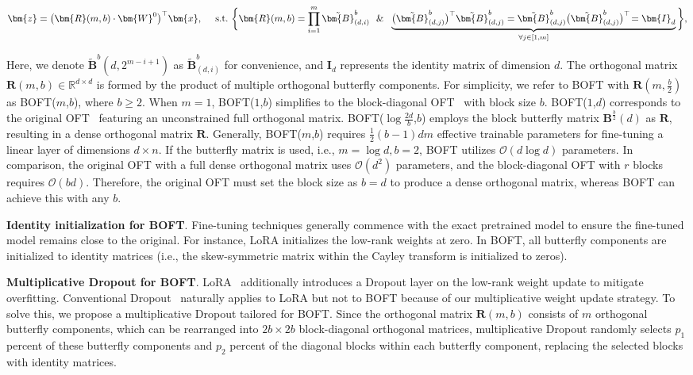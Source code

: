 \begin{equation}
    \begin{aligned}\nonumber
    \bm{z}=\big(\bm{R}(m,b)\cdot\bm{W}^0\big)^\top\bm{x},~~~~\text{s.t.}~\bigg{\{}\bm{R}(m,b)=\prod_{i=1}^m \tilde{\bm{B}}^b_{(d,i)}~~\&~~\underbrace{\big(\tilde{\bm{B}}^b_{(d,j)}\big)^\top\tilde{\bm{B}}^b_{(d,j)}=\tilde{\bm{B}}^b_{(d,j)}\big(\tilde{\bm{B}}^b_{(d,j)}\big)^\top\!=\bm{I}_d}_{\forall j\in [1, m]}\bigg{\}},
    \end{aligned}
\end{equation}

Here, we denote $\tilde{\bm{B}}^b(d,2^{m - i+1})$ as $\tilde{\bm{B}}^b_{(d,i)}$ for convenience, and $\bm{I}_d$ represents the identity matrix of dimension $d$. The orthogonal matrix $\bm{R}(m,b)\in\mathbb{R}^{d\times d}$ is formed by the product of multiple orthogonal butterfly components. For simplicity, we refer to BOFT with $\bm{R}(m,\frac{b}{2})$ as BOFT($m$,$b$), where $b\geq 2$. When $m=1$, BOFT($1$,$b$) simplifies to the block-diagonal OFT~\cite{qiu2023controlling} with block size $b$. BOFT($1$,$d$) corresponds to the original OFT~\cite{qiu2023controlling} featuring an unconstrained full orthogonal matrix. BOFT($\log \frac{2d}{b}$,$b$) employs the block butterfly matrix $\bm{B}^{\frac{b}{2}}(d)$ as $\bm{R}$, resulting in a dense orthogonal matrix $\bm{R}$. Generally, BOFT($m$,$b$) requires $\frac{1}{2}(b-1)dm$ effective trainable parameters for fine-tuning a linear layer of dimensions $d\times n$. If the butterfly matrix is used, i.e., $m=\log d,b=2$, BOFT utilizes $\mathcal{O}(d\log d)$ parameters. In comparison, the original OFT with a full dense orthogonal matrix uses $\mathcal{O}(d^2)$ parameters, and the block-diagonal OFT with $r$ blocks requires $\mathcal{O}(bd)$. Therefore, the original OFT must set the block size as $b=d$ to produce a dense orthogonal matrix, whereas BOFT can achieve this with any $b$.

\textbf{Identity initialization for BOFT}. Fine-tuning techniques generally commence with the exact pretrained model to ensure the fine-tuned model remains close to the original. For instance, LoRA initializes the low-rank weights at zero. In BOFT, all butterfly components are initialized to identity matrices (i.e., the skew-symmetric matrix within the Cayley transform is initialized to zeros).

\textbf{Multiplicative Dropout for BOFT}. LoRA~\cite{hulora2022} additionally introduces a Dropout layer on the low-rank weight update to mitigate overfitting. Conventional Dropout~\cite{srivastava2014dropout} naturally applies to LoRA but not to BOFT because of our multiplicative weight update strategy. To solve this, we propose a multiplicative Dropout tailored for BOFT. Since the orthogonal matrix $\bm{R}(m,b)$ consists of $m$ orthogonal butterfly components, which can be rearranged into $2b\times 2b$ block-diagonal orthogonal matrices, multiplicative Dropout randomly selects $p_1$ percent of these butterfly components and $p_2$ percent of the diagonal blocks within each butterfly component, replacing the selected blocks with identity matrices.

